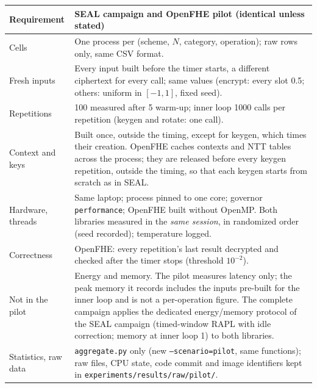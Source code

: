 \documentclass[11pt]{article}
\begin{document}
\begin{center}\footnotesize
\begin{tabular}{@{}L{3.3cm}L{12.7cm}@{}}
\toprule
\textbf{Requirement} & \textbf{SEAL campaign and OpenFHE pilot (identical unless stated)} \\
\midrule
Cells & One process per (scheme, $N$, category, operation); raw rows only, same CSV format. \\
Fresh inputs & Every input built before the timer starts, a different ciphertext for every call; same values (encrypt: every slot 0.5; others: uniform in $[-1,1]$, fixed seed). \\
Repetitions & 100 measured after 5 warm-up; inner loop 1000 calls per repetition (keygen and rotate: one call). \\
Context and keys & Built once, outside the timing, except for keygen, which times their creation. OpenFHE caches contexts and NTT tables across the process; they are released before every keygen repetition, outside the timing, so that each keygen starts from scratch as in SEAL. \\
Hardware, threads & Same laptop; process pinned to one core; governor \texttt{performance}; OpenFHE built without OpenMP. Both libraries measured in the \emph{same session}, in randomized order (seed recorded); temperature logged. \\
Correctness & OpenFHE: every repetition's last result decrypted and checked after the timer stops (threshold $10^{-2}$). \\
Not in the pilot & Energy and memory. The pilot measures latency only; the peak memory it records includes the inputs pre-built for the inner loop and is not a per-operation figure. The complete campaign applies the dedicated energy/memory protocol of the SEAL campaign (timed-window RAPL with idle correction; memory at inner loop 1) to both libraries. \\
Statistics, raw data & \texttt{aggregate.py} only (new \texttt{--scenario=pilot}, same functions); raw files, CPU state, code commit and image identifiers kept in \texttt{experiments/results/raw/pilot/}. \\
\bottomrule
\end{tabular}
\end{center}
\end{document}
